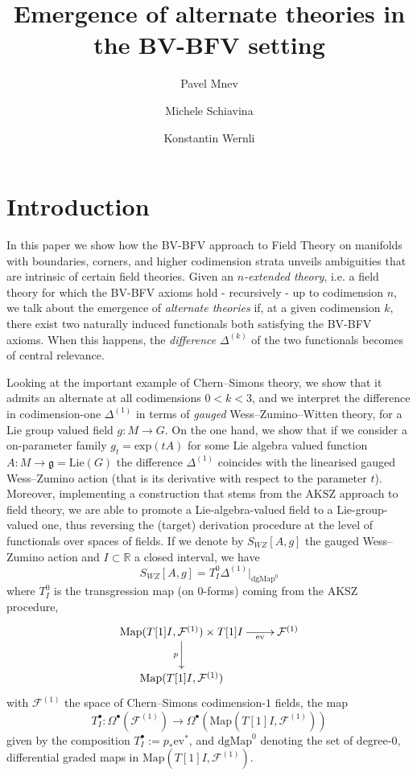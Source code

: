 \documentclass[a4paper,reqno]{amsart}
\title{Emergence of alternate theories in the BV-BFV setting}
\author{Pavel Mnev}
\author{Michele Schiavina}
\author{Konstantin Wernli}
\begin{document}
\maketitle

\section{Introduction}
In this paper we show how the BV-BFV approach to Field Theory on manifolds with boundaries, corners, and higher codimension strata unveils ambiguities that are intrinsic of certain field theories. Given an \emph{$n$-extended theory}, i.e. a field theory for which the BV-BFV axioms hold - recursively - up to codimension $n$, we talk about the emergence of \emph{alternate theories} if, at a given codimension $k$, there exist two naturally induced functionals both satisfying the BV-BFV axioms. When this happens, the \emph{difference} $\Delta^{(k)}$ of the two functionals becomes of central relevance.

Looking at the important example of Chern--Simons theory, we show that it admits an alternate at all codimensions $0< k < 3$, and we interpret the difference in codimension-one $\Delta^{(1)}$ in terms of \emph{gauged} Wess--Zumino--Witten theory, for a Lie group valued field $g\colon M \longrightarrow G$. On the one hand, we show that if we consider a on-parameter family $g_t=\mathrm{exp}(tA)$ for some Lie algebra valued function $A\colon M\longrightarrow \mathfrak{g}=\mathrm{Lie}(G)$ the difference $\Delta^{(1)}$ coincides with the linearised gauged Wess--Zumino action (that is its derivative with respect to the parameter $t$). Moreover, implementing a construction that stems from the AKSZ approach to field theory, we are able to promote a Lie-algebra-valued field to a Lie-group-valued one, thus reversing the (target) derivation procedure at the level of functionals over spaces of fields. If we denote by $S_{WZ}[A,g]$ the gauged Wess--Zumino action and $I\subset \mathbb{R}$ a closed interval, we have
\begin{equation}
S_{WZ}[A,g]=T_{I}^0 \Delta^{(1)}\vert_{\mathrm{dgMap}^0}
\end{equation}
where $T_{I}^0$ is the transgression map (on $0$-forms) coming from the AKSZ procedure,
\begin{equation}
\xymatrix{
\mathrm{Map}(T[1]I, \mathcal{F}^{(1)})\times T[1]I \ar[d]_{p}   \ar[r]_-{\mathrm{ev}}  & \mathcal{F}^{(1)}\\
\mathrm{Map}(T[1]I, \mathcal{F}^{(1)}) & 
}
\end{equation}
with $\mathcal{F}^{(1)}$ the space of Chern--Simons codimension-$1$ fields, the map 
$$T^\bullet_I\colon\Omega^\bullet\left(\mathcal{F}^{(1)}\right)\longrightarrow \Omega^\bullet\left(\mathrm{Map}(T[1]I, \mathcal{F}^{(1)})\right)$$ 
given by the composition $T^\bullet_I:=p_* \mathrm{ev}^*$, and $\mathrm{dgMap}^{0}$ denoting the set of degree-$0$, differential graded maps in $\mathrm{Map}(T[1]I, \mathcal{F}^{(1)})$.
\end{document}
